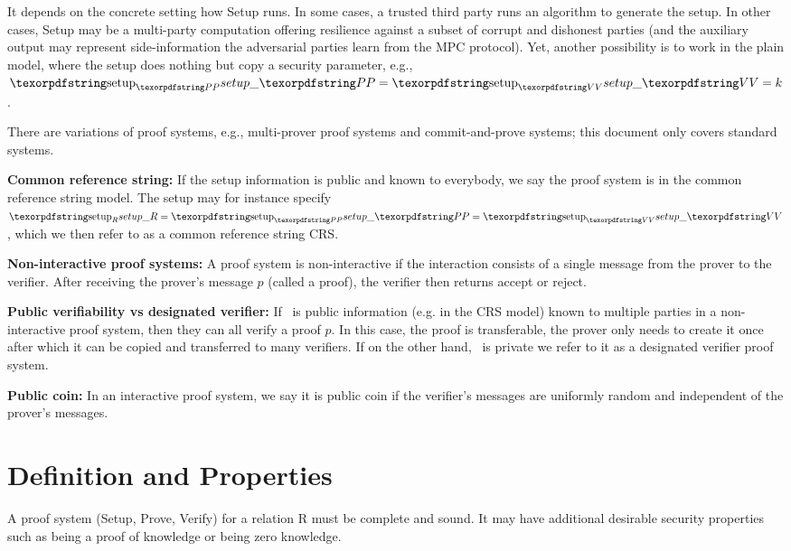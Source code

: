 It depends on the concrete setting how Setup runs. 
In some cases, a trusted third party runs an algorithm to generate the setup. 
In other cases, Setup may be a multi-party computation offering resilience against a subset of corrupt and dishonest parties (and the auxiliary output may represent side-information the adversarial parties learn from the MPC protocol). 
Yet, another possibility is to work in the plain model, where the setup does nothing but copy a security parameter, e.g., $\setP = \setV = k$.
 
There are variations of proof systems, e.g., multi-prover proof systems and commit-and-prove systems; this document only covers standard systems.
 
\textbf{Common reference string:} If the setup information is public and known to everybody, we say the proof system is in the common reference string model. 
The setup may for instance specify $\setR = \setP = \setV$, which we then refer to as a common reference string CRS.
 
\textbf{Non-interactive proof systems:} 
A proof system is non-interactive if the interaction consists of a single message from the prover to the verifier.
After receiving the prover’s message $p$ (called a proof), the verifier then returns accept or reject.
 
\textbf{Public verifiability vs designated verifier:} 
If \setV\ is public information (e.g. in the CRS model) known to multiple parties in a non-interactive proof system, then they can all verify a proof $p$. 
In this case, the proof is transferable, the prover only needs to create it once after which it can be copied and transferred to many verifiers. 
If on the other hand, \setV\ is private we refer to it as a designated verifier proof system.
 
\textbf{Public coin:} 
In an interactive proof system, we say it is public coin if the verifier’s messages are uniformly random and independent of the prover’s messages.



\section{Definition and Properties}
\label{security:defs-props}
 
A proof system (Setup, Prove, Verify) for a relation R must be complete and sound.
It may have additional desirable security properties such as being a proof of knowledge or being zero knowledge.\loosen
 



